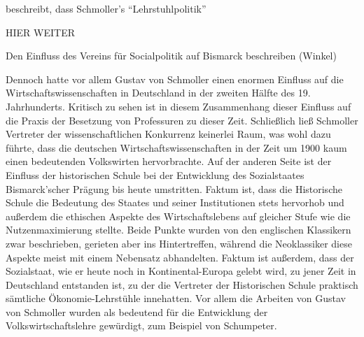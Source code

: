 \textcite[S. 112]{Winkel1989} beschreibt, dass Schmoller's "`Lehrstuhlpolitik"' 

HIER WEITER

Den Einfluss des Vereins für Socialpolitik auf Bismarck beschreiben (Winkel)

Dennoch hatte vor allem Gustav von Schmoller einen enormen Einfluss auf die Wirtschaftswissenschaften in Deutschland in der zweiten Hälfte des 19. Jahrhunderts. Kritisch zu sehen ist in diesem Zusammenhang dieser Einfluss auf die Praxis der Besetzung von Professuren zu dieser Zeit. Schließlich ließ Schmoller Vertreter der wissenschaftlichen Konkurrenz keinerlei Raum, was wohl dazu führte, dass die deutschen Wirtschaftswissenschaften  in der Zeit um 1900 kaum einen bedeutenden Volkswirten hervorbrachte. Auf der anderen Seite ist der Einfluss der historischen Schule bei der Entwicklung des Sozialstaates Bismarck'scher Prägung bis heute umstritten. Faktum ist, dass die Historische Schule die Bedeutung des Staates und seiner Institutionen stets hervorhob und außerdem die ethischen Aspekte des Wirtschaftslebens auf gleicher Stufe wie die Nutzenmaximierung stellte. Beide Punkte wurden von den englischen Klassikern zwar beschrieben, gerieten aber ins Hintertreffen, während die Neoklassiker diese Aspekte meist mit einem Nebensatz abhandelten. Faktum ist außerdem, dass der Sozialstaat, wie er heute noch in Kontinental-Europa gelebt wird, zu jener Zeit in Deutschland entstanden ist, zu der die Vertreter der Historischen Schule praktisch sämtliche Ökonomie-Lehrstühle innehatten. Vor allem die Arbeiten von Gustav von Schmoller wurden als bedeutend für die Entwicklung der Volkswirtschaftslehre gewürdigt, zum Beispiel von Schumpeter.




